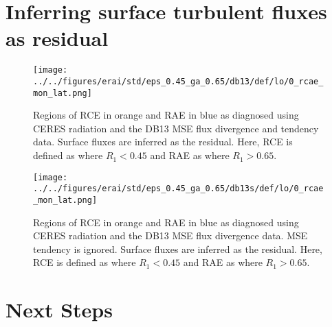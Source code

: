\documentclass[11pt]{article}
\begin{document}
\section{Inferring surface turbulent fluxes as residual}
\label{sec:org08c094e}

\begin{figure}[htbp]
\centering
\texttt{[image: ../../figures/erai/std/eps\_0.45\_ga\_0.65/db13/def/lo/0\_rcae\_mon\_lat.png]}
\caption{\label{fig:org612054f}Regions of RCE in orange and RAE in blue as diagnosed using CERES radiation and the DB13 MSE flux divergence and tendency data. Surface fluxes are inferred as the residual. Here, RCE is defined as where \(R_1 < 0.45\) and RAE as where \(R_1 > 0.65\).}
\end{figure}

\begin{figure}[htbp]
\centering
\texttt{[image: ../../figures/erai/std/eps\_0.45\_ga\_0.65/db13s/def/lo/0\_rcae\_mon\_lat.png]}
\caption{\label{fig:orgeddfbe5}Regions of RCE in orange and RAE in blue as diagnosed using CERES radiation and the DB13 MSE flux divergence data. MSE tendency is ignored. Surface fluxes are inferred as the residual. Here, RCE is defined as where \(R_1 < 0.45\) and RAE as where \(R_1 > 0.65\).}
\end{figure}

\section{Next Steps}
\label{sec:orgc7f8b08}



\end{document}
